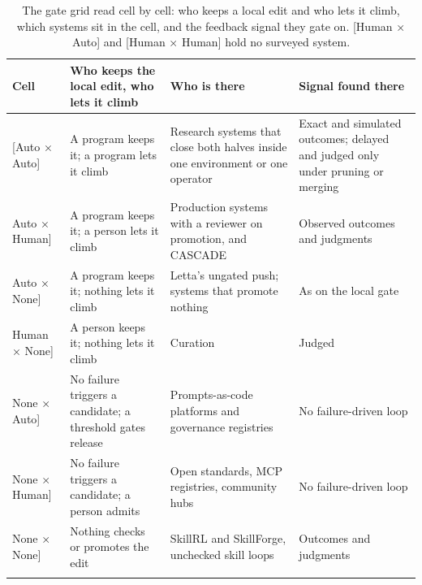 \documentclass[
  11pt,
]{article}
\begin{document}
\begin{table}[htbp]
\caption{The gate grid read cell by cell: who keeps a local edit and who lets it climb, which systems sit in the cell, and the feedback signal they gate on. {[}Human × Auto{]} and {[}Human × Human{]} hold no surveyed system.}\label{tab:VII-1}
\centering\small
\begin{tabular}{@{}
  >{\raggedright\arraybackslash}p{}
  >{\raggedright\arraybackslash}p{}
  >{\raggedright\arraybackslash}p{}
  >{\raggedright\arraybackslash}p{}@{}}
\toprule\noalign{}
\begin{minipage}[b]{\linewidth}\raggedright
Cell
\end{minipage} & \begin{minipage}[b]{\linewidth}\raggedright
Who keeps the local edit, who lets it climb
\end{minipage} & \begin{minipage}[b]{\linewidth}\raggedright
Who is there
\end{minipage} & \begin{minipage}[b]{\linewidth}\raggedright
Signal found there
\end{minipage} \\
\midrule\noalign{}


{[}Auto × Auto{]} & A program keeps it; a program lets it climb & Research systems that close both halves inside one environment or one operator & Exact and simulated outcomes; delayed and judged only under pruning or merging \\ \addlinespace[2.5pt]
{[}Auto × Human{]} & A program keeps it; a person lets it climb & Production systems with a reviewer on promotion, and CASCADE & Observed outcomes and judgments \\ \addlinespace[2.5pt]
{[}Auto × None{]} & A program keeps it; nothing lets it climb & Letta's ungated push; systems that promote nothing & As on the local gate \\ \addlinespace[2.5pt]
{[}Human × None{]} & A person keeps it; nothing lets it climb & Curation & Judged \\ \addlinespace[2.5pt]
{[}None × Auto{]} & No failure triggers a candidate; a threshold gates release & Prompts-as-code platforms and governance registries & No failure-driven loop \\ \addlinespace[2.5pt]
{[}None × Human{]} & No failure triggers a candidate; a person admits & Open standards, MCP registries, community hubs & No failure-driven loop \\ \addlinespace[2.5pt]
{[}None × None{]} & Nothing checks or promotes the edit & SkillRL and SkillForge, unchecked skill loops & Outcomes and judgments \\ \addlinespace[2.5pt]
\bottomrule\noalign{}
\end{tabular}
\end{table}
\end{document}
